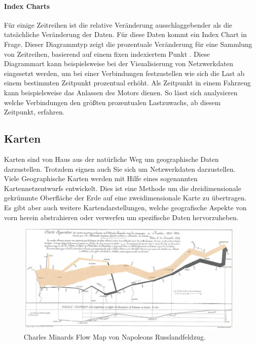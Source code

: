\documentclass[draft=false
              ,paper=a4
              ,twoside=false
              ,fontsize=11pt
              ,headsepline
              ,BCOR10mm
              ,DIV11
              ]{scrbook}
\begin{document}
\paragraph{Index Charts} %
\label{par:index_charts}
Für einige Zeitreihen ist die relative Veränderung ausschlaggebender als die tatsächliche Veränderung der Daten. Für diese Daten kommt ein Index Chart in Frage. Dieser Diagrammtyp zeigt die prozentuale Veränderung für eine Sammlung von Zeitreihen, basierend auf einem fixen indexiertem Punkt \cite{heer_tour_2010}. Diese Diagrammart kann beispielsweise bei der Visualisierung von Netzwerkdaten eingesetzt werden, um bei einer Verbindungen festzustellen wie sich die Last ab einem bestimmten Zeitpunkt prozentual erhöht. Als Zeitpunkt in einem Fahrzeug kann beispielsweise das Anlassen des Motors dienen. So lässt sich analysieren welche Verbindungen den größten prozentualen Lastzuwachs, ab diesem Zeitpunkt, erfahren.

\subsection{Karten} %
\label{ssub:karten}
Karten sind von Haus aus der natürliche Weg um geographische Daten darzustellen. Trotzdem eignen auch Sie sich um Netzwerkdaten darzustellen. Viele Geographische Karten werden mit Hilfe eines sogenannten Kartennetzentwurfs entwickelt. Dies ist eine Methode um die dreidimensionale gekrümmte Oberfläche der Erde auf eine zweidimensionale Karte zu übertragen. Es gibt aber auch weitere Kartendarstellungen, welche geografische Aspekte von vorn herein abstrahieren oder verwerfen um spezifische Daten hervorzuheben.
\begin{figure}[htbp]
  \centering
  \includegraphics[width=\textwidth]{img/napoleon}
  \caption{Charles Minards Flow Map von Napoleons Russlandfeldzug.}
  \label{fig:nap}
 \end{figure}
\end{document}

